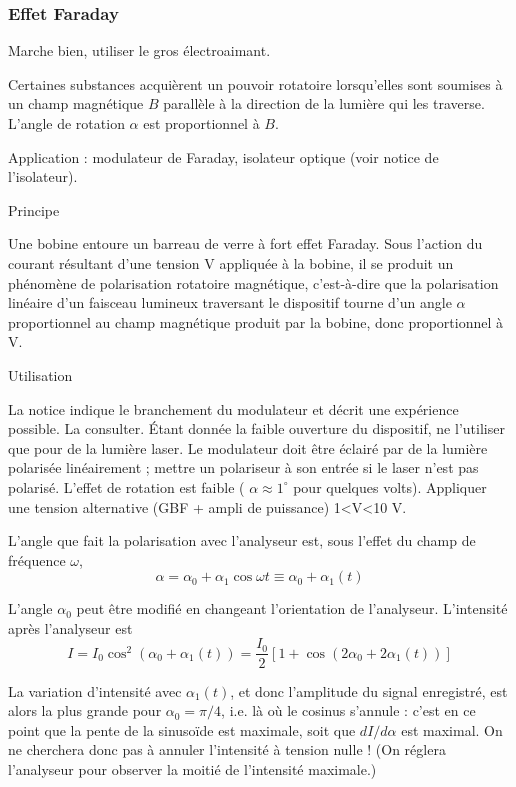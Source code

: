 \documentclass{article}%
\begin{document}
\subsubsection{Effet Faraday}

Marche bien, utiliser le gros électroaimant.

Certaines substances acquièrent un pouvoir rotatoire lorsqu'elles sont soumises à un champ magnétique $B$ parallèle à la direction de la lumière qui les traverse. L'angle de rotation $\alpha$ est proportionnel à $B$.

Application : modulateur de Faraday, isolateur optique (voir notice de l'isolateur).

Principe

Une bobine entoure un barreau de verre à fort effet Faraday. Sous l'action du courant résultant d'une tension V appliquée à la bobine, il se produit un phénomène de polarisation rotatoire magnétique, c'est-à-dire que la polarisation linéaire d'un faisceau lumineux traversant le dispositif tourne d'un angle $\alpha$ proportionnel au champ magnétique produit par la bobine, donc proportionnel à V.

Utilisation

La notice indique le branchement du modulateur et décrit une expérience possible. La consulter. Étant donnée la faible ouverture du dispositif, ne l'utiliser que pour de la lumière laser. Le modulateur doit être éclairé par de la lumière polarisée linéairement ; mettre un polariseur à son entrée si le laser n'est pas polarisé. L'effet de rotation est faible ( $\alpha \approx 1^{\circ}$ pour quelques volts). Appliquer une tension alternative (GBF + ampli de puissance) 1<V<10 V.

L'angle que fait la polarisation avec l'analyseur est, sous l'effet du champ de fréquence $\omega$,
\[ \alpha=\alpha_0+\alpha_1\cos\omega t\equiv \alpha_0 + \alpha_1(t)\]

L'angle $\alpha_0$ peut être modifié en changeant l'orientation de l'analyseur. L'intensité après l'analyseur est
\[ I=I_0\cos^2(\alpha_0+\alpha_1(t)) = \frac{I_0}{2}\left[1+\cos(2\alpha_0 + 2\alpha_1(t))\right]\]

La variation d'intensité avec $\alpha_1(t)$, et donc l'amplitude du signal enregistré, est alors la plus grande pour $\alpha_0=\pi/4$, i.e. là où le cosinus s'annule : c'est en ce point que la pente de la sinusoïde est maximale, soit que $dI/d\alpha$ est maximal. On ne cherchera donc pas à annuler l'intensité à tension nulle ! (On réglera l'analyseur pour observer la moitié de l'intensité maximale.)
\end{document}
